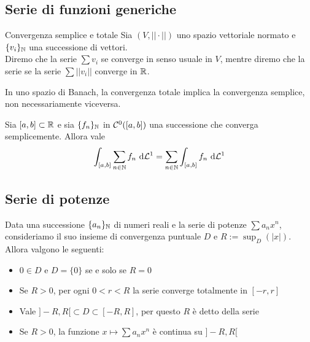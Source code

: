 \documentclass{article}
\begin{document}
\subsection{Serie di funzioni generiche}

\begin{definition}{Convergenza semplice e totale}{}
    Sia $(V,||\cdot||)$ uno spazio vettoriale normato e $\{v_i\}_{\mathbb{N}}$ una successione di vettori.\\
    Diremo che la serie $\sum v_i$  se converge in senso usuale in $V$, mentre diremo che la serie  se la serie $\sum ||v_i||$ converge in $\mathbb{R}$.
\end{definition}

\begin{remark}{}{}
    In uno spazio di Banach, la convergenza totale implica la convergenza semplice, non necessariamente viceversa.
\end{remark}

\begin{proposition}{}{}
    Sia $[a,b]\subset \mathbb{R}$ e sia $\{f_n\}_{\mathbb{N}}$ in $\mathcal{C}^0([a,b])$ una successione che converga semplicemente. Allora vale
    \[\int_{[a,b]} \sum_{n\in\mathbb{N}} f_n \text{ d} \mathcal{L}^1 =\sum_{n\in\mathbb{N}}  \int_{[a,b]} f_n \text{ d} \mathcal{L}^1\]
\end{proposition}

\subsection{Serie di potenze}

\begin{proposition}{}{}
    Data una successione $\{a_n\}_{\mathbb{N}}$ di numeri reali e la serie di potenze $\sum a_n x^n$, consideriamo il suo insieme di convergenza puntuale $D$ e $R:=\sup_D(|x|)$. Allora valgono le seguenti:\begin{itemize}
        \item $0 \in D$ e $D = \{0\}$ se e solo se $R=0$
        \item Se $R>0$, per ogni $0<r<R$ la serie converge totalmente in $[-r,r]$
        \item Vale $]-R,R[ \subset D \subset [-R,R]$, per questo $R$ è detto  della serie
        \item Se $R>0$, la funzione $x\mapsto \sum a_nx^n$ è continua su $]-R,R[$
    \end{itemize}
\end{proposition}
\end{document}
